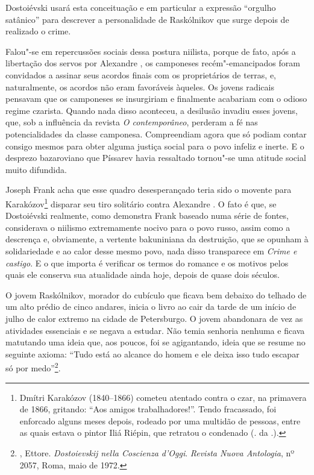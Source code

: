 {{Dostoiévski usará esta conceituação e em particular a expressão
``orgulho satânico'' para descrever a personalidade de Raskólnikov que
surge depois de realizado o crime.

Falou"-se em repercussões sociais dessa postura niilista, porque de fato,
após a libertação dos servos por Alexandre , os camponeses
recém"-emancipados foram convidados a assinar seus acordos finais com os
proprietários de terras, e, naturalmente, os acordos não eram favoráveis
àqueles. Os jovens radicais pensavam que os camponeses se insurgiriam e
finalmente acabariam com o odioso regime czarista. Quando nada disso
aconteceu, a desilusão invadiu esses jovens, que, sob a influência da
revista \emph{O contemporâneo}, perderam a fé nas potencialidades da
classe camponesa. Compreendiam agora que só podiam contar consigo mesmos
para obter alguma justiça social para o povo infeliz e inerte. E o
desprezo bazaroviano que Píssarev havia ressaltado tornou"-se uma atitude
social muito difundida.

Joseph Frank acha que esse quadro desesperançado teria sido o movente
para Karakózov\footnote{Dmítri Karakózov (1840--1866) cometeu atentado
  contra o czar, na primavera de 1866, gritando: ``Aos amigos
  trabalhadores!''. Tendo fracassado, foi enforcado alguns meses depois,
  rodeado por uma multidão de pessoas, entre as quais estava o pintor
  Iliá Riépin, que retratou o condenado (. da .).} disparar seu tiro
solitário contra Alexandre . O fato é que, se Dostoiévski realmente,
como demonstra Frank baseado numa série de fontes, considerava o
niilismo extremamente nocivo para o povo russo, assim como a descrença
e, obviamente, a vertente bakuniniana da destruição, que se opunham à
solidariedade e ao calor desse mesmo povo, nada disso transparece em
\emph{Crime e castigo}. E o que importa é verificar os termos do romance
e os motivos pelos quais ele conserva sua atualidade ainda hoje, depois
de quase dois séculos.

O jovem Raskólnikov, morador do cubículo que ficava bem debaixo do
telhado de um alto prédio de cinco andares, inicia o livro ao cair da
tarde de um início de julho de calor extremo na cidade de Petersburgo. O
jovem abandonara de vez as atividades essenciais e se negava a estudar.
Não temia senhoria nenhuma e ficava matutando uma ideia que, aos poucos,
foi se agigantando, ideia que se resume no seguinte axioma: ``Tudo está
ao alcance do homem e ele deixa isso tudo escapar só por
medo''\footnote{, Ettore. \emph{Dostoievskij nella Coscienza
  d'Oggi}. \emph{Revista Nuova Antologia}, nº 2057, Roma, maio de 1972.}.

}}
